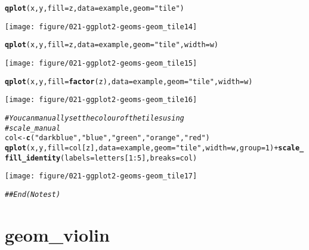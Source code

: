 \documentclass[a4paper,titlepage]{tufte-handout}\usepackage[]{graphicx}\usepackage[]{color}
\makeatletter
\def\maxwidth{ %
  \ifdim\Gin@nat@width>\linewidth
    \linewidth
  \else
    \Gin@nat@width
  \fi
}
\newcommand{\hlnum}[1]{\textcolor[rgb]{0.686,0.059,0.569}{#1}}%
\newcommand{\hlstr}[1]{\textcolor[rgb]{0.192,0.494,0.8}{#1}}%
\newcommand{\hlcom}[1]{\textcolor[rgb]{0.678,0.584,0.686}{\textit{#1}}}%
\newcommand{\hlopt}[1]{\textcolor[rgb]{0,0,0}{#1}}%
\newcommand{\hlstd}[1]{\textcolor[rgb]{0.345,0.345,0.345}{#1}}%
\newcommand{\hlkwb}[1]{\textcolor[rgb]{0.69,0.353,0.396}{#1}}%
\newcommand{\hlkwc}[1]{\textcolor[rgb]{0.333,0.667,0.333}{#1}}%
\newcommand{\hlkwd}[1]{\textcolor[rgb]{0.737,0.353,0.396}{\textbf{#1}}}%
\newenvironment{kframe}{%
 \def\at@end@of@kframe{}%
 \ifinner\ifhmode%
  \def\at@end@of@kframe{\end{minipage}}%
  \begin{minipage}{\columnwidth}%
 \fi\fi%
 \def\FrameCommand##1{\hskip\@totalleftmargin \hskip-\fboxsep
 \colorbox{shadecolor}{##1}\hskip-\fboxsep
     \hskip-\linewidth \hskip-\@totalleftmargin \hskip\columnwidth}%
 \MakeFramed {\advance\hsize-\width
   \@totalleftmargin\z@ \linewidth\hsize
   \@setminipage}}%
 {\par\unskip\endMakeFramed%
 \at@end@of@kframe}
\newenvironment{knitrout}{}{} %
\makeatother
\begin{document}
\begin{knitrout}
\begin{kframe}
\begin{alltt}
\hlkwd{qplot}\hlstd{(x, y,} \hlkwc{fill}\hlstd{=z,} \hlkwc{data}\hlstd{=example,} \hlkwc{geom}\hlstd{=}\hlstr{"tile"}\hlstd{)}
\end{alltt}
\end{kframe}
\texttt{[image: figure/021-ggplot2-geoms-geom\_tile14]} 
\begin{kframe}\begin{alltt}
\hlkwd{qplot}\hlstd{(x, y,} \hlkwc{fill}\hlstd{=z,} \hlkwc{data}\hlstd{=example,} \hlkwc{geom}\hlstd{=}\hlstr{"tile"}\hlstd{,} \hlkwc{width}\hlstd{=w)}
\end{alltt}
\end{kframe}
\texttt{[image: figure/021-ggplot2-geoms-geom\_tile15]} 
\begin{kframe}\begin{alltt}
\hlkwd{qplot}\hlstd{(x, y,} \hlkwc{fill}\hlstd{=}\hlkwd{factor}\hlstd{(z),} \hlkwc{data}\hlstd{=example,} \hlkwc{geom}\hlstd{=}\hlstr{"tile"}\hlstd{,} \hlkwc{width}\hlstd{=w)}
\end{alltt}
\end{kframe}
\texttt{[image: figure/021-ggplot2-geoms-geom\_tile16]} 
\begin{kframe}\begin{alltt}
\hlcom{# You can manually set the colour of the tiles using}
\hlcom{# scale_manual}
\hlstd{col} \hlkwb{<-} \hlkwd{c}\hlstd{(}\hlstr{"darkblue"}\hlstd{,} \hlstr{"blue"}\hlstd{,} \hlstr{"green"}\hlstd{,} \hlstr{"orange"}\hlstd{,} \hlstr{"red"}\hlstd{)}
\hlkwd{qplot}\hlstd{(x, y,} \hlkwc{fill}\hlstd{=col[z],} \hlkwc{data}\hlstd{=example,} \hlkwc{geom}\hlstd{=}\hlstr{"tile"}\hlstd{,} \hlkwc{width}\hlstd{=w,} \hlkwc{group}\hlstd{=}\hlnum{1}\hlstd{)} \hlopt{+} \hlkwd{scale_fill_identity}\hlstd{(}\hlkwc{labels}\hlstd{=letters[}\hlnum{1}\hlopt{:}\hlnum{5}\hlstd{],} \hlkwc{breaks}\hlstd{=col)}
\end{alltt}
\end{kframe}
\texttt{[image: figure/021-ggplot2-geoms-geom\_tile17]} 
\begin{kframe}\begin{alltt}
\hlcom{## End(No test)}
\end{alltt}
\end{kframe}
\end{knitrout}


\section{geom\_violin}
\end{document}
